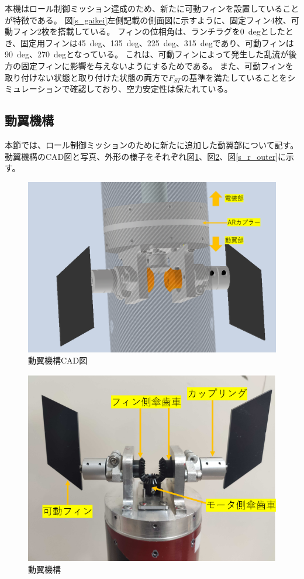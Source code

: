 \documentclass[a4paper,11pt,titlepage,uplatex]{jsarticle}
\begin{document}
本機はロール制御ミッション達成のため、新たに可動フィンを設置していることが特徴である。
図\ref{s_gaikei}左側記載の側面図に示すように、固定フィン4枚、可動フィン2枚を搭載している。
フィンの位相角は、ランチラグを\SI{0}{deg}としたとき、固定用フィンは\SI{45}{deg}、\SI{135}{deg}、\SI{225}{deg}、\SI{315}{deg}であり、可動フィンは\SI{90}{deg}、\SI{270}{deg}となっている。
これは、可動フィンによって発生した乱流が後方の固定フィンに影響を与えないようにするためである。
また、可動フィンを取り付けない状態と取り付けた状態の両方で$F_{ST}$の基準を満たしていることをシミュレーションで確認しており、空力安定性は保たれている。

\subsection{動翼機構}
\label{douyoku}
本節では、ロール制御ミッションのために新たに追加した動翼部について記す。
動翼機構のCAD図と写真、外形の様子をそれぞれ図\ref{s_r_all}、図\ref{s_r_pic}、図\ref{s_r_outer}に示す。

\begin{figure}[H]
    \centering
    \includegraphics[scale = 0.3]{pic_str/s_roll_all.png}
    \caption{動翼機構CAD図}
    \label{s_r_all}
\end{figure}

\begin{figure}[H]
    \centering
    \includegraphics[scale = 0.6]{pic_str/s_r_pic.png}
    \caption{動翼機構}
    \label{s_r_pic}
\end{figure}
\end{document}
